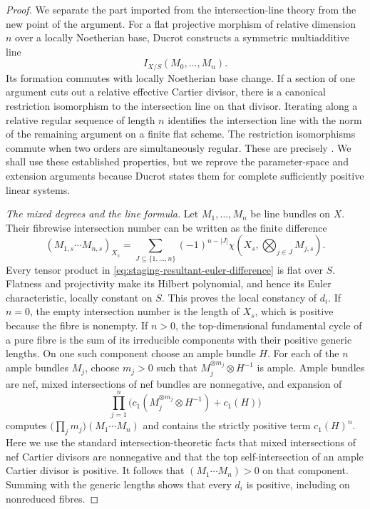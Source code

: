 \begin{proof}
We separate the part imported from the intersection-line theory from the
new point of the argument.  For a flat projective morphism of relative
dimension \(n\) over a locally Noetherian base, Ducrot constructs a
symmetric multiadditive line
\[
 I_{X/S}(M_0,\ldots,M_n).
\]
Its formation commutes with locally Noetherian base change.  If a section
of one argument cuts out a relative effective Cartier divisor, there is a
canonical restriction isomorphism to the intersection line on that
divisor.  Iterating along a relative regular sequence of length \(n\)
identifies the intersection line with the norm of the remaining argument
on a finite flat scheme.  The restriction isomorphisms commute when two
orders are simultaneously regular.  These are precisely
\cite[Proposition~6.1.1 and Corollary~6.1.2]{Ducrot05Cube}.  We shall use
these established properties, but we reprove the parameter-space and
extension arguments because Ducrot states them for complete sufficiently
positive linear systems.

\medskip
\noindent\emph{The mixed degrees and the line formula.}
Let \(M_1,\ldots,M_n\) be line bundles on \(X\).  Their fibrewise
intersection number can be written as the finite difference
\begin{equation}\label{eq:staging-resultant-euler-difference}
 (M_{1,s}\cdots M_{n,s})_{X_s}
 =
 \sum_{J\subseteq\{1,\ldots,n\}}
 (-1)^{n-|J|}
 \chi\left(
   X_s,\bigotimes_{j\in J}M_{j,s}
 \right).
\end{equation}
Every tensor product in \eqref{eq:staging-resultant-euler-difference} is
flat over \(S\).  Flatness and projectivity make its Hilbert polynomial,
and hence its Euler characteristic, locally constant on \(S\).  This proves
the local constancy of \(d_i\).  If \(n=0\), the empty intersection number
is the length of \(X_s\), which is positive because the fibre is nonempty.
If \(n>0\), the top-dimensional fundamental cycle of a pure fibre is the
sum of its irreducible components with their positive generic lengths.  On
one such component choose an ample bundle \(H\).  For each of the \(n\)
ample bundles \(M_j\), choose \(m_j>0\) such that
\(M_j^{\otimes m_j}\otimes H^{-1}\) is ample.  Ample bundles are nef, mixed
intersections of nef bundles are nonnegative, and expansion of
\[
 \prod_{j=1}^n
 \bigl(c_1(M_j^{\otimes m_j}\otimes H^{-1})+c_1(H)\bigr)
\]
computes
\(\bigl(\prod_jm_j\bigr)(M_1\cdots M_n)\) and contains the strictly
positive term \(c_1(H)^n\).  Here we use the standard intersection-theoretic
facts that mixed intersections of nef Cartier divisors are nonnegative and
that the top self-intersection of an ample Cartier divisor is positive.
It follows that
\((M_1\cdots M_n)>0\) on that component.  Summing with the generic lengths
shows that every \(d_i\) is positive, including on nonreduced fibres.


\end{proof}
